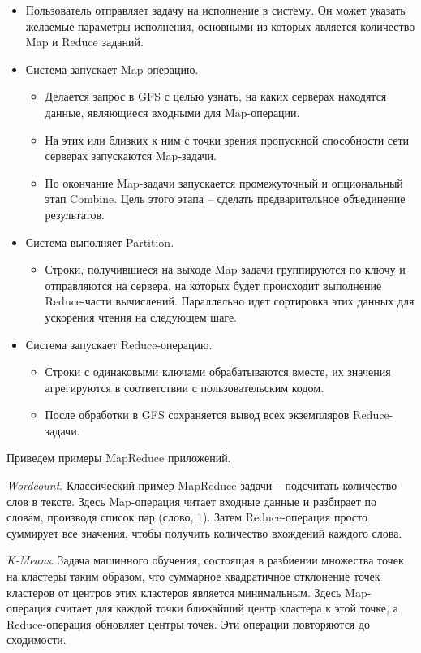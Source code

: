 \documentclass[../diploma.tex]{subfile}
\begin{document}
    \begin{itemize}
        \item Пользователь отправляет задачу на исполнение в систему. Он может
        указать желаемые параметры исполнения, основными из которых является
        количество Map и Reduce заданий.

        \item Система запускает Map операцию.
        \begin{itemize}
            \item Делается запрос в GFS с целью узнать, на каких серверах
                  находятся данные, являющиеся входными для Map-операции.
            \item На этих или близких к ним с точки зрения пропускной
                  способности сети серверах запускаются Map-задачи. 
            \item По окончание Map-задачи запускается промежуточный и
                  опциональный этап Combine. Цель этого этапа -- сделать
                  предварительное объединение результатов.
        \end{itemize}

        \item Система выполняет Partition. 
        \begin{itemize}
            \item Строки, получившиеся на выходе Map задачи группируются по
                  ключу и отправляются на сервера, на которых будет происходит
                  выполнение Reduce-части вычислений. Параллельно идет
                  сортировка этих данных для ускорения чтения на следующем шаге.
        \end{itemize}

        \item Система запускает Reduce-операцию.

        \begin{itemize}
            \item Строки с одинаковыми ключами обрабатываются вместе, их
                  значения агрегируются в соответствии с пользовательским кодом.
            \item После обработки в GFS сохраняется вывод всех экземпляров
                  Reduce-задачи.
        \end{itemize}
    \end{itemize}   

    Приведем примеры MapReduce приложений. 
    
    \textit{Wordcount}. Классический пример MapReduce задачи -- подсчитать
    количество слов в тексте. Здесь Map-операция читает входные данные и
    разбирает по словам, производя список пар (слово, 1). Затем Reduce-операция
    просто суммирует все значения, чтобы получить количество вхождений каждого
    слова.

    \textit{K-Means}. Задача машинного обучения, состоящая в разбиении множества
    точек на кластеры таким образом, что суммарное квадратичное отклонение точек
    кластеров от центров этих кластеров является минимальным. Здесь Map-операция
    считает для каждой точки ближайший центр кластера к этой точке, а
    Reduce-операция обновляет центры точек. Эти операции повторяются до сходимости.
    
    
\end{document}
